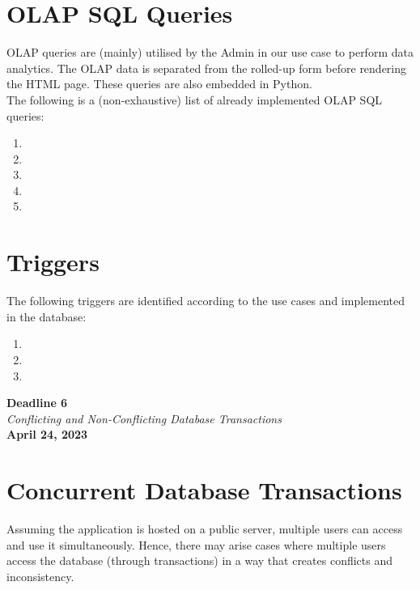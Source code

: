 \documentclass[12pt]{report}
\newcommand{\deadline}[3]{
    \hspace{0pt}
    \vfill
    \begin{center}
        \Huge \textbf{Deadline #1} \\
        \vspace*{5pt}
        \Large \textit{#2} \\
        \vspace*{25pt}
        \large \textbf{#3}
    \end{center}
    \vfill
    \pagebreak
}
\begin{document}
    \section*{\Huge OLAP SQL Queries}
    \vspace*{10pt}

    OLAP queries are (mainly) utilised by the Admin in our use case to perform data analytics.
    The OLAP data is separated from the rolled-up form before rendering the HTML page. These queries are also embedded in Python.
    \vspace*{10pt} \\
    The following is a (non-exhaustive) list of already implemented OLAP SQL queries:

    \begin{enumerate}
        \item 
        \item 
        \item 
        \item 
        \item 
    \end{enumerate}

    \section*{\Huge Triggers}

    The following triggers are identified according to the use cases and implemented in the database:

    \begin{enumerate}
        \item 
        \item 
        \item 
    \end{enumerate}

    \vfill \pagebreak

    \deadline{6}{Conflicting and Non-Conflicting Database Transactions}{April 24, 2023}

    \section*{\Huge Concurrent Database Transactions}
    \vspace*{10pt}
    Assuming the application is hosted on a public server, multiple users can access and use it simultaneously.
    Hence, there may arise cases where multiple users access the database (through transactions) in a way that creates conflicts and inconsistency.
\end{document}
